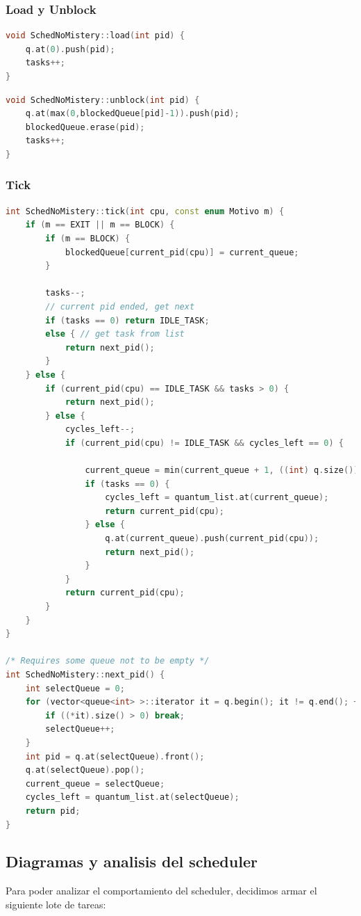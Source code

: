 \subsubsection{Load y Unblock}
\begin{lstlisting}[language=C++, breaklines=true]
void SchedNoMistery::load(int pid) {
	q.at(0).push(pid);
	tasks++;
}
\end{lstlisting}

\begin{lstlisting}[language=C++, breaklines=true]
void SchedNoMistery::unblock(int pid) {
	q.at(max(0,blockedQueue[pid]-1)).push(pid);
	blockedQueue.erase(pid);
	tasks++;
}
\end{lstlisting}


\subsubsection{Tick}
\begin{lstlisting}[language=C++, breaklines=true]
int SchedNoMistery::tick(int cpu, const enum Motivo m) {
	if (m == EXIT || m == BLOCK) {
		if (m == BLOCK) {
			blockedQueue[current_pid(cpu)] = current_queue;
		}
		
		tasks--;
		// current pid ended, get next
		if (tasks == 0) return IDLE_TASK;
		else { // get task from list
			return next_pid();
		}
	} else {
		if (current_pid(cpu) == IDLE_TASK && tasks > 0) {
			return next_pid();
		} else {
			cycles_left--;
			if (current_pid(cpu) != IDLE_TASK && cycles_left == 0) {

				current_queue = min(current_queue + 1, ((int) q.size()) - 1);
				if (tasks == 0) {
					cycles_left = quantum_list.at(current_queue);
					return current_pid(cpu);
				} else {
					q.at(current_queue).push(current_pid(cpu));
					return next_pid();
				}
			}
			return current_pid(cpu);
		}
	}
}

/* Requires some queue not to be empty */
int SchedNoMistery::next_pid() {
	int selectQueue = 0;
	for (vector<queue<int> >::iterator it = q.begin(); it != q.end(); ++it) {
		if ((*it).size() > 0) break;
		selectQueue++;
	}
	int pid = q.at(selectQueue).front();
	q.at(selectQueue).pop();
	current_queue = selectQueue;
	cycles_left = quantum_list.at(selectQueue);
	return pid;
}
\end{lstlisting}

\subsection{Diagramas y analisis del scheduler}
Para poder analizar el comportamiento del scheduler, decidimos armar el siguiente lote de tareas:

